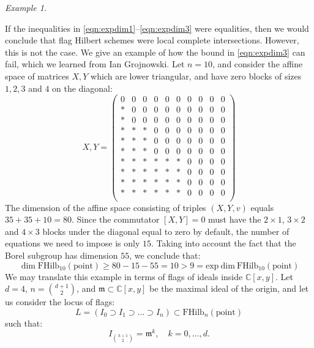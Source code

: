 \documentclass[12pt]{amsart}
\numberwithin{equation}{section}
\theoremstyle{definition}
\theoremstyle{remark}
\newtheorem{example}[theorem]{Example}
\newcommand{\CC}{\mathbb{C}}
\renewcommand{\1}{\mathbf{1}}
\newcommand{\FH}{\mathrm{FHilb}}
\newcommand{\point}{\mathrm{point}}
\newcommand{\expdim}{\mathrm{exp \ dim \ }}
\begin{document}
\begin{example}
\label{ex:not lci}

If the inequalities in \eqref{eqn:expdim1}--\eqref{eqn:expdim3} were equalities, then we would conclude that flag Hilbert schemes were local complete intersections. However, this is not the case. We  give an example of how the bound in \eqref{eqn:expdim3} can fail, which we learned from Ian Grojnowski.  Let $n=10$, and  consider the affine space of matrices $X,Y$ which are lower triangular, and have zero blocks of sizes $1,2,3$ and $4$ on the diagonal:
\begin{equation}
\label{eqn:big matrix}
X,Y = \left( \begin{array}{cccccccccc}
0 & 0 & 0 & 0 & 0 & 0 & 0 & 0 & 0 & 0 \\
* & 0 & 0 & 0 & 0 & 0 & 0 & 0 & 0 & 0 \\
* & 0 & 0 & 0 & 0 & 0 & 0 & 0 & 0 & 0 \\
* & * & * & 0 & 0 & 0 & 0 & 0 & 0 & 0 \\
* & * & * & 0 & 0 & 0 & 0 & 0 & 0 & 0 \\
* & * & * & 0 & 0 & 0 & 0 & 0 & 0 & 0 \\
* & * & * & * & * & * & 0 & 0 & 0 & 0 \\
* & * & * & * & * & * & 0 & 0 & 0 & 0 \\
* & * & * & * & * & * & 0 & 0 & 0 & 0 \\
* & * & * & * & * & * & 0 & 0 & 0 & 0 \\
\end{array} \right)
\end{equation}
The dimension of the affine space consisting of triples $(X,Y,v)$ equals $35+35+10 = 80$. Since the commutator $[X,Y]=0$ must have the $2\times 1$, $3\times 2$ and $4\times 3$ blocks under the diagonal equal to zero by default, the number of equations we need to impose is only $15$. Taking into account the fact that the Borel subgroup has dimension $55$, we conclude that:
$$
\dim \FH_{10}(\point) \geq 80 - 15 - 55 = 10 > 9 = \expdim \FH_{10}(\point)
$$
We may translate this example in terms of flags of ideals inside $\CC[x,y]$. Let $d=4$, $n = \binom{d+1}{2}$, and $\mathfrak{m} \subset \CC[x,y]$ be the maximal ideal of the origin, and let us consider the locus of flags:
$$
L = (I_0\supset I_1\supset \ldots \supset I_{n}) \subset \FH_{n}(\point)
$$
such that:
\begin{equation}
\label{eqn:weird ideal}
I_{\binom{k+1}{2}}=\mathfrak{m}^{k},\quad k = 0,\ldots,d.
\end{equation}

\end{example}
\end{document}
